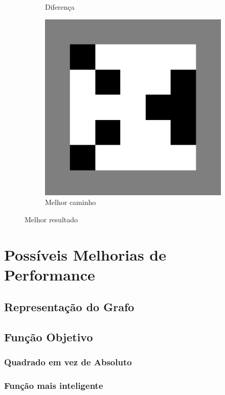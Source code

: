 \documentclass{article}
\begin{document}
\begin{figure}
\begin{subfigure}{0.3\textwidth}
        \caption{Diferença}
    \end{subfigure}
    \begin{subfigure}{0.3\textwidth}
        \centering
        \includegraphics[width=0.9\linewidth]{face/evap005-it100/run1-border}
        \caption{Melhor caminho}
    \end{subfigure}
    \caption{Melhor resultado}
\end{figure}

\section{Possíveis Melhorias de Performance}
\subsection{Representação do Grafo}

\subsection{Função Objetivo}
\subsubsection{Quadrado em vez de Absoluto}
\subsubsection{Função mais inteligente}
\end{document}

